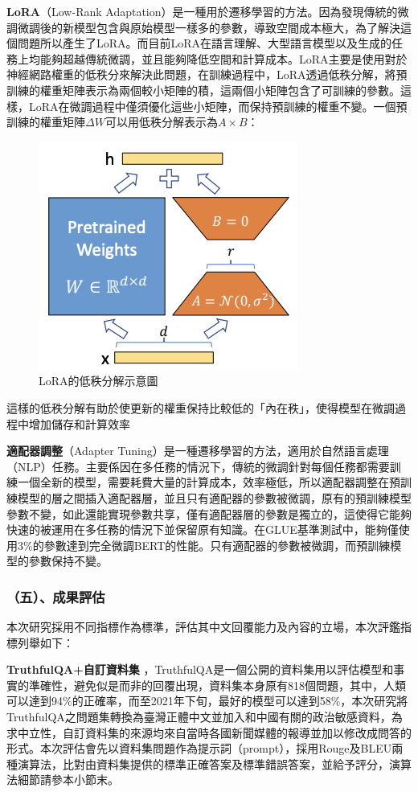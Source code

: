 \documentclass[12pt,a4paper,MingLiU,UTF8,natbib]{article}
\def\xeCJKembold{0.4}
\def\saveCJKnode{\dimen255\lastkern}
\def\restoreCJKnode{\kern-\dimen255\kern\dimen255}
\let\CJKoldsymbol\CJKsymbol
\let\CJKoldpunctsymbol\CJKpunctsymbol
\def\CJKfakeboldsymbol#1{%
	\special{pdf:literal direct 2 Tr \xeCJKembold\space w}%
	\CJKoldsymbol{#1}%
	\saveCJKnode
	\special{pdf:literal direct 0 Tr}%
	\restoreCJKnode}
\def\CJKfakeboldpunctsymbol#1{%
	\special{pdf:literal direct 2 Tr \xeCJKembold\space w}%
	\CJKoldpunctsymbol{#1}%
	\saveCJKnode
	\special{pdf:literal direct 0 Tr}%
	\restoreCJKnode}
\newcommand\CJKfakebold[1]{%
	\let\CJKsymbol\CJKfakeboldsymbol
	\let\CJKpunctsymbol\CJKfakeboldpunctsymbol
	#1%
	\let\CJKsymbol\CJKoldsymbol
	\let\CJKpunctsymbol\CJKoldpunctsymbol}
\begin{document}
	\textbf{LoRA}（Low-Rank Adaptation）是一種用於遷移學習的方法。因為發現傳統的微調微調後的新模型包含與原始模型一樣多的參數，導致空間成本極大，為了解決這個問題所以產生了LoRA。而目前LoRA在語言理解、大型語言模型以及生成的任務上均能夠超越傳統微調，並且能夠降低空間和計算成本。LoRA主要是使用對於神經網路權重的低秩分來解決此問題，在訓練過程中，LoRA透過低秩分解，將預訓練的權重矩陣表示為兩個較小矩陣的積，這兩個小矩陣包含了可訓練的參數。這樣，LoRA在微調過程中僅須優化這些小矩陣，而保持預訓練的權重不變。一個預訓練的權重矩陣$\Delta W$可以用低秩分解表示為$A×B$：
	\begin{figure}[H]
		\centering
	\includegraphics{20120468S5MbIQ5N0s}
	\caption{LoRA的低秩分解示意圖\protect\cite{hu2021lora}}
	\end{figure}
這樣的低秩分解有助於使更新的權重保持比較低的「內在秩」，使得模型在微調過程中增加儲存和計算效率\cite{hu2021lora}

	\textbf{適配器調整}（Adapter Tuning）是一種遷移學習的方法，適用於自然語言處理（NLP）任務。主要係因在多任務的情況下，傳統的微調針對每個任務都需要訓練一個全新的模型，需要耗費大量的計算成本，效率極低，所以適配器調整在預訓練模型的層之間插入適配器層，並且只有適配器的參數被微調，原有的預訓練模型參數不變，如此還能實現參數共享，僅有適配器層的參數是獨立的，這使得它能夠快速的被運用在多任務的情況下並保留原有知識。在GLUE基準測試中，能夠僅使用3\%的參數達到完全微調BERT的性能。只有適配器的參數被微調，而預訓練模型的參數保持不變。\cite{zhou2022efficiently}


	\subsubsection{（五）、成果評估}
	本次研究採用不同指標作為標準，評估其中文回覆能力及內容的立場，本次評鑑指標列舉如下：

	\CJKfakebold{\textbf{TruthfulQA+自訂資料集}}，TruthfulQA是一個公開的資料集用以評估模型和事實的準確性，避免似是而非的回覆出現，資料集本身原有818個問題，其中，人類可以達到94\%的正確率，而至2021年下旬，最好的模型可以達到58\%\cite{lin2022truthfulqa}，本次研究將TruthfulQA之問題集轉換為臺灣正體中文並加入和中國有關的政治敏感資料，為求中立性，自訂資料集的來源均來自當時各國新聞媒體的報導並加以修改成問答的形式。本次評估會先以資料集問題作為提示詞（prompt），採用Rouge及BLEU兩種演算法，比對由資料集提供的標準正確答案及標準錯誤答案，並給予評分，演算法細節請參本小節末。
\end{document}
